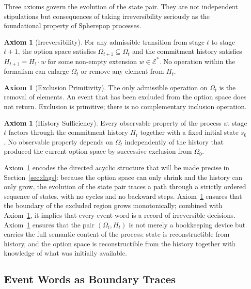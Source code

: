\documentclass[12pt]{article}
\theoremstyle{plain}
\theoremstyle{definition}
\newtheorem{axiom}[theorem]{Axiom}
\theoremstyle{remark}
\begin{document}
Three axioms govern the evolution of the state pair.  They are not independent
stipulations but consequences of taking irreversibility seriously as the
foundational property of Spherepop processes.

\begin{axiom}[Irreversibility]
\label{ax:irrev}
For any admissible transition from stage $t$ to stage $t+1$, the option
space satisfies $\Omega_{t+1} \subseteq \Omega_t$ and the commitment history
satisfies $H_{t+1} = H_t \cdot w$ for some non-empty extension
$w \in \mathcal{E}^{*}$.  No operation within the formalism can enlarge
$\Omega_t$ or remove any element from $H_t$.
\end{axiom}

\begin{axiom}[Exclusion Primitivity]
\label{ax:exclusion}
The only admissible operation on $\Omega_t$ is the removal of elements.
An event that has been excluded from the option space does not return.
Exclusion is primitive; there is no complementary inclusion operation.
\end{axiom}

\begin{axiom}[History Sufficiency]
\label{ax:sufficiency}
Every observable property of the process at stage $t$ factors through the
commitment history $H_t$ together with a fixed initial state $s_0$.  No
observable property depends on $\Omega_t$ independently of the history that
produced the current option space by successive exclusion from $\Omega_0$.
\end{axiom}

Axiom~\ref{ax:irrev} encodes the directed acyclic structure that will be
made precise in Section~\ref{sec:dags}: because the option space can only
shrink and the history can only grow, the evolution of the state pair traces
a path through a strictly ordered sequence of states, with no cycles and no
backward steps.  Axiom~\ref{ax:exclusion} ensures that the boundary of the
excluded region grows monotonically; combined with Axiom~\ref{ax:irrev}, it
implies that every event word is a record of irreversible decisions.
Axiom~\ref{ax:sufficiency} ensures that the pair $(\Omega_t, H_t)$ is not
merely a bookkeeping device but carries the full semantic content of the
process: state is reconstructible from history, and the option space is
reconstructible from the history together with knowledge of what was initially
available.

\subsection{Event Words as Boundary Traces}
\end{document}
